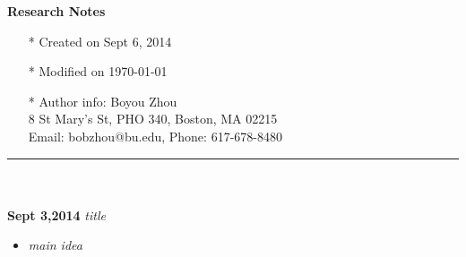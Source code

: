 \documentclass[]{article}
\begin{document}
\pagestyle{empty}
{\large\textbf{Research Notes}}
\begin{itemize}
    \item[*] Created on Sept 6, 2014
    \item[*] Modified on \today
    \item[*] Author info: Boyou Zhou\\
             8 St Mary's St, PHO 340, Boston, MA 02215\\
             Email: bobzhou@bu.edu, Phone: 617-678-8480
\end{itemize}


\rule[-0.1cm]{7.5in}{0.01cm}\\
\\
\noindent \textbf{Sept 3,2014}
\textit{title}
\indent		\begin{itemize}

            \item \textit{main idea}
        \end{itemize}
\end{document}
